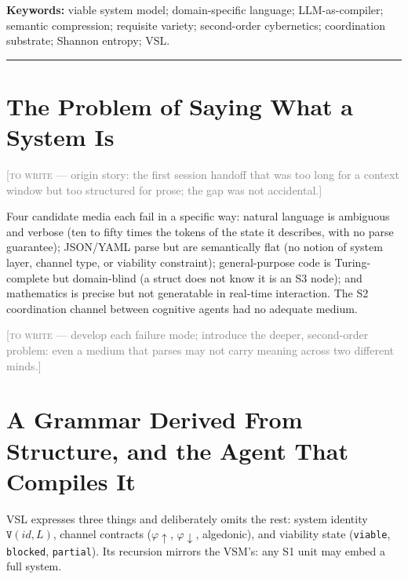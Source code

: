 \documentclass[12pt]{article}
\newcommand{\phiup}{\ensuremath{\varphi\!\uparrow}}
\newcommand{\phidown}{\ensuremath{\varphi\!\downarrow}}
\newcommand{\TODO}[1]{\medskip\noindent\textcolor{gray}{\small[\textsc{to write} --- #1]}\medskip}
\begin{document}
\textbf{Keywords:} viable system model; domain-specific language; LLM-as-compiler;
semantic compression; requisite variety; second-order cybernetics; coordination
substrate; Shannon entropy; VSL.

\medskip\hrule\medskip
\tableofcontents
\newpage

\section{The Problem of Saying What a System Is}
\label{sec:problem}


\TODO{origin story: the first session handoff that was too long for a context window
but too structured for prose; the gap was not accidental.}

Four candidate media each fail in a specific way: natural language is ambiguous and
verbose (ten to fifty times the tokens of the state it describes, with no parse
guarantee); JSON/YAML parse but are semantically flat (no notion of system layer,
channel type, or viability constraint); general-purpose code is Turing-complete but
domain-blind (a struct does not know it is an S3 node); and mathematics is precise but
not generatable in real-time interaction. The S2 coordination channel between cognitive
agents had no adequate medium.

\TODO{develop each failure mode; introduce the deeper, second-order problem: even a
medium that parses may not carry meaning across two different minds.}

\section{A Grammar Derived From Structure, and the Agent That Compiles It}
\label{sec:language}

VSL expresses three things and deliberately omits the rest: system identity
$\mathtt{V}(\mathit{id}, L)$, channel contracts (\phiup, \phidown, algedonic), and
viability state (\texttt{viable}, \texttt{blocked}, \texttt{partial}). Its recursion
mirrors the VSM's: any S1 unit may embed a full system.
\end{document}
